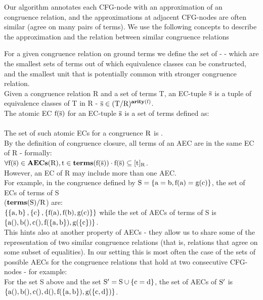Our algorithm annotates each CFG-node with an approximation of an congruence relation, and the approximations at adjacent CFG-nodes are often similar (agree on many pairs of terms). We use the following concepts to describe the approximation and the relation between similar congruence relations

For a given congruence relation on ground terms we define the set of  - \newdef{\AEC} - which are the smallest sets of terms out of which equivalence classes can be constructed, and the smallest unit that is potentially common with stronger congruence relation.\\
Given a congruence relation R and a set of terms T, an EC-tuple $\mathrm{\overline{s}}$ is a tuple of equivalence classes of T in R - $\mathrm{\mathrm{\overline{s}} \in (T/R)^{\mathbf{arity}(\mathrm{f})}}$.\\
The atomic EC $\mathrm{f}(\mathrm{\overline{s}})$ for an EC-tuple $\mathrm{\overline{s}}$ is a set of terms defined as:\\
 \\
The set of such atomic ECs for a congruence $\mathrm{R}$ is .\\
By the definition of congruence closure, all terms of an AEC are in the same EC of R - formally:\\
$\mathrm{\forall \mathrm{f}(\mathrm{\overline{s}}) \in \mathbf{AECs}(\mathrm{R}),\mathrm{t} \in \mathbf{terms}(\mathrm{\mathrm{f}(\mathrm{\overline{s}})}) \cdot \mathrm{f}(\mathrm{\overline{s}}) \subseteq [t]_{R}}$.\\
However, an EC of R may include more than one AEC.\\
For example, in the congruence defined by $\mathrm{S = \left\{\mathrm{a=b,f(a)=g(c)}\right\}}$, the set of ECs of terms of S\\ ($\mathrm{\mathbf{terms}(\mathrm{S})/R}$) are:\\
$\left\{\mathrm{ \left\{\mathrm{a,b}\right\}, \left\{\mathrm{c}\right\}, \left\{\mathrm{f(a),f(b),g(c)}\right\}}\right\}$ while the set of AECs of terms of S is \\
$\left\{\mathrm{a(),b(),c(),f(\left\{\mathrm{a,b}\right\}),g(\left\{\mathrm{c}\right\})}\right\}$.\\
This hints also at another property of AECs - they allow us to share some of the representation of two similar congruence relations (that is, relations that agree on some subset of equalities). 
In our setting this is most often the case of the sets of possible AECs for the congruence relations that hold at two consecutive CFG-nodes - for example: \\
For the set S above and the set $\mathrm{S' = S \cup \left\{\mathrm{c=d}\right\}}$,
the set of AECs of $\mathrm{S'}$ is\\ $\left\{\mathrm{a(),b(),c(),d(),f(\left\{\mathrm{a,b}\right\}),g(\left\{\mathrm{c,d}\right\})}\right\}$.\\

